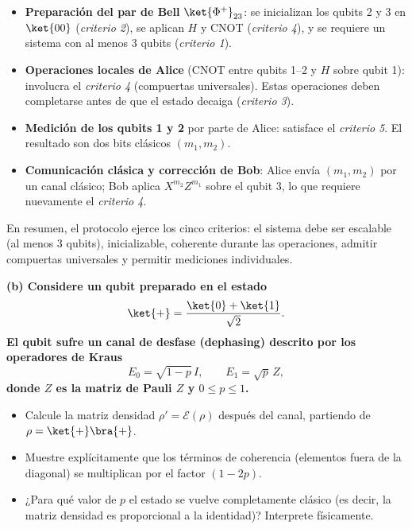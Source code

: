 \begin{itemize}
    \item \textbf{Preparación del par de Bell} $\ket{\Phi^+}_{23}$: se inicializan los qubits 2 y 3 en $\ket{00}$ (\emph{criterio 2}), se aplican $H$ y CNOT (\emph{criterio 4}), y se requiere un sistema con al menos 3 qubits (\emph{criterio 1}).

    \item \textbf{Operaciones locales de Alice} (CNOT entre qubits 1--2 y $H$ sobre qubit 1): involucra el \emph{criterio 4} (compuertas universales). Estas operaciones deben completarse antes de que el estado decaiga (\emph{criterio 3}).

    \item \textbf{Medición de los qubits 1 y 2} por parte de Alice: satisface el \emph{criterio 5}. El resultado son dos bits clásicos $(m_1, m_2)$.

    \item \textbf{Comunicación clásica y corrección de Bob}: Alice envía $(m_1, m_2)$ por un canal clásico; Bob aplica $X^{m_2} Z^{m_1}$ sobre el qubit 3, lo que requiere nuevamente el \emph{criterio 4}.
\end{itemize}

En resumen, el protocolo ejerce los cinco criterios: el sistema debe ser escalable (al menos 3 qubits), inicializable, coherente durante las operaciones, admitir compuertas universales y permitir mediciones individuales.

\vspace{0.5cm}

{\bfseries (b) Considere un qubit preparado en el estado
    $$
        \ket{+} = \frac{\ket{0} + \ket{1}}{\sqrt{2}}.
    $$
    El qubit sufre un canal de desfase (dephasing) descrito por los operadores de Kraus
    $$
        E_0 = \sqrt{1-p}\, I, \qquad E_1 = \sqrt{p}\, Z,
    $$
    donde $Z$ es la matriz de Pauli $Z$ y $0 \leq p \leq 1$.
    \begin{itemize}
        \item Calcule la matriz densidad $\rho' = \mathcal{E}(\rho)$ después del canal, partiendo de $\rho = \ket{+}\bra{+}$.
        \item Muestre explícitamente que los términos de coherencia (elementos fuera de la diagonal) se multiplican por el factor $(1-2p)$.
        \item ¿Para qué valor de $p$ el estado se vuelve completamente clásico (es decir, la matriz densidad es proporcional a la identidad)? Interprete físicamente.
    \end{itemize}
}

